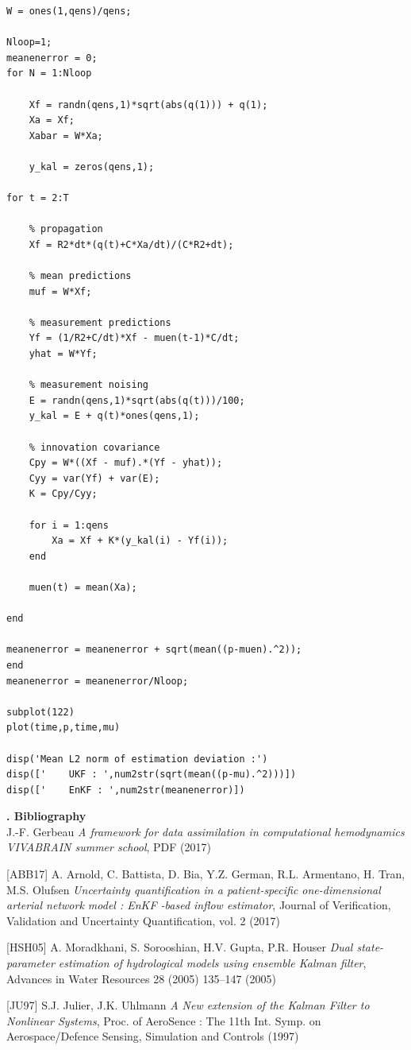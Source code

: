 \documentclass[a4paper]{article}
\newcounter{c}
\newcounter{d}
\newcounter{r}
\newcounter{e}
\newcommand{\chapitre}[1]{\stepcounter{c}\setcounter{e}{0}\setcounter{d}{0}\setcounter{r}{0}\noindent\textbf{\Large\arabic{c}. #1}\\}
\begin{document}
\begin{verbatim}
W = ones(1,qens)/qens;

Nloop=1;
meanenerror = 0;
for N = 1:Nloop
    
    Xf = randn(qens,1)*sqrt(abs(q(1))) + q(1);
    Xa = Xf;
    Xabar = W*Xa;
    
    y_kal = zeros(qens,1);
    
for t = 2:T

    % propagation
    Xf = R2*dt*(q(t)+C*Xa/dt)/(C*R2+dt);

    % mean predictions
    muf = W*Xf;
    
    % measurement predictions
    Yf = (1/R2+C/dt)*Xf - muen(t-1)*C/dt;
    yhat = W*Yf;

    % measurement noising
    E = randn(qens,1)*sqrt(abs(q(t)))/100;
    y_kal = E + q(t)*ones(qens,1);

    % innovation covariance
    Cpy = W*((Xf - muf).*(Yf - yhat));
    Cyy = var(Yf) + var(E);
    K = Cpy/Cyy;

    for i = 1:qens
        Xa = Xf + K*(y_kal(i) - Yf(i));
    end
    
    muen(t) = mean(Xa);

end

meanenerror = meanenerror + sqrt(mean((p-muen).^2));
end
meanenerror = meanenerror/Nloop;

subplot(122)
plot(time,p,time,mu)

disp('Mean L2 norm of estimation deviation :')
disp(['    UKF : ',num2str(sqrt(mean((p-mu).^2)))])
disp(['    EnKF : ',num2str(meanenerror)])
\end{verbatim}




\newpage
\chapitre{Bibliography}

J.-F. Gerbeau \emph{A framework for data assimilation in computational hemodynamics  
VIVABRAIN summer school}, PDF (2017)


[ABB17] A. Arnold, C. Battista, D. Bia, Y.Z. German, R.L. Armentano, H. Tran, M.S. Olufsen \emph{Uncertainty quantification in a patient-specific one-dimensional arterial network model : EnKF -based inflow estimator}, Journal of Verification, Validation and Uncertainty Quantification, vol. 2 (2017)


[HSH05] A. Moradkhani, S. Sorooshian, H.V. Gupta, P.R. Houser \emph{Dual state-parameter estimation of hydrological models using ensemble Kalman filter}, Advances in Water Resources 28 (2005) 135–147 (2005)


[JU97] S.J. Julier, J.K. Uhlmann \emph{A New extension of the Kalman Filter to Nonlinear Systems}, Proc. of AeroSence : The 11th Int. Symp. on Aerospace/Defence Sensing, Simulation and Controls (1997)
\end{document}
